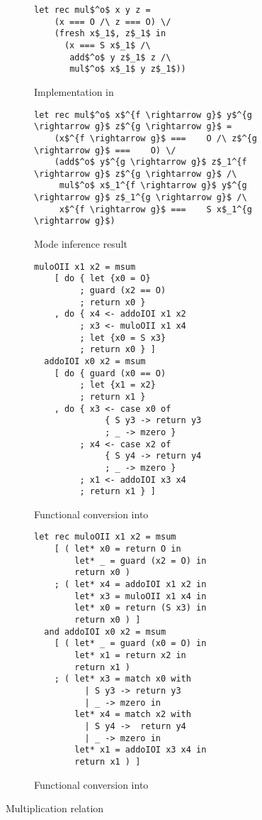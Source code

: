 \begin{figure*}[t!]
  \centering
  \begin{subfigure}[b]{0.45\textwidth}
    \begin{lstlisting}[frame=tb]
  let rec mul$^o$ x y z =
    (x === O /\ z === O) \/
    (fresh x$_1$, z$_1$ in
      (x === S x$_1$ /\
       add$^o$ y z$_1$ z /\
       mul$^o$ x$_1$ y z$_1$))
    \end{lstlisting}
    \caption{Implementation in \mk}
    \label{fig:mult_mk}
  \end{subfigure}
  \hfill
  \begin{subfigure}[b]{0.45\textwidth}
    \begin{lstlisting}[frame=tb]
  let rec mul$^o$ x$^{f \rightarrow g}$ y$^{g \rightarrow g}$ z$^{g \rightarrow g}$ =
    (x$^{f \rightarrow g}$ ===    O /\ z$^{g \rightarrow g}$ ===    O) \/
    (add$^o$ y$^{g \rightarrow g}$ z$_1^{f \rightarrow g}$ z$^{g \rightarrow g}$ /\
     mul$^o$ x$_1^{f \rightarrow g}$ y$^{g \rightarrow g}$ z$_1^{g \rightarrow g}$ /\
     x$^{f \rightarrow g}$ ===    S x$_1^{g \rightarrow g}$)
    \end{lstlisting}
    \caption{Mode inference result}
    \label{fig:mult_modded}
  \end{subfigure}

  \hfill

  \begin{subfigure}[b]{0.45\textwidth}
    \begin{lstlisting}[frame=tb]
  muloOII x1 x2 = msum
    [ do { let {x0 = O}
         ; guard (x2 == O)
         ; return x0 }
    , do { x4 <- addoIOI x1 x2
         ; x3 <- muloOII x1 x4
         ; let {x0 = S x3}
         ; return x0 } ]
  addoIOI x0 x2 = msum
    [ do { guard (x0 == O)
         ; let {x1 = x2}
         ; return x1 }
    , do { x3 <- case x0 of
              { S y3 -> return y3
              ; _ -> mzero }
         ; x4 <- case x2 of
              { S y4 -> return y4
              ; _ -> mzero }
         ; x1 <- addoIOI x3 x4
         ; return x1 } ]
    \end{lstlisting}
    \caption{Functional conversion into \haskell}
    \label{fig:mult_haskell}
  \end{subfigure}
  \hfill
  \begin{subfigure}[b]{0.45\textwidth}
    \begin{lstlisting}[frame=tb]
  let rec muloOII x1 x2 = msum
    [ ( let* x0 = return O in
        let* _ = guard (x2 = O) in
        return x0 )
    ; ( let* x4 = addoIOI x1 x2 in
        let* x3 = muloOII x1 x4 in
        let* x0 = return (S x3) in
        return x0 ) ]
  and addoIOI x0 x2 = msum
    [ ( let* _ = guard (x0 = O) in
        let* x1 = return x2 in
        return x1 )
    ; ( let* x3 = match x0 with
          | S y3 -> return y3
          | _ -> mzero in
        let* x4 = match x2 with
          | S y4 ->  return y4
          | _ -> mzero in
        let* x1 = addoIOI x3 x4 in
        return x1 ) ]
    \end{lstlisting}
    \caption{Functional conversion into \ocaml}
    \label{fig:mult_ocaml}
  \end{subfigure}

  \caption{Multiplication relation}
  \label{fig:mult}
\end{figure*}
